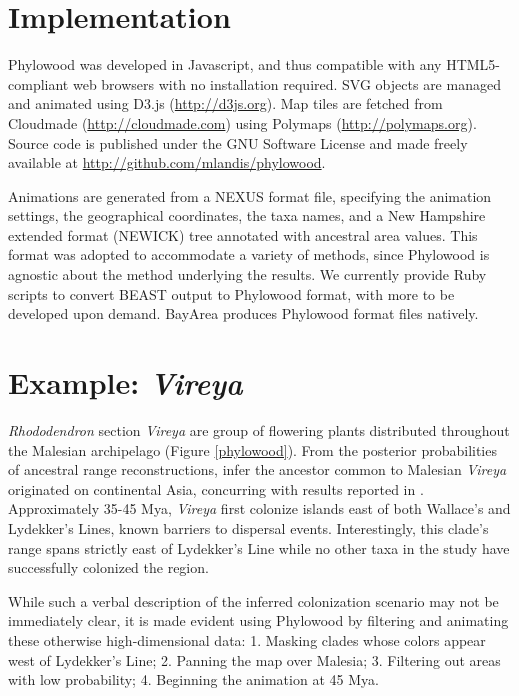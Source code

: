 \documentclass[11pt]{article}
\begin{document}
\section{Implementation}

Phylowood was developed in Javascript, and thus compatible with any HTML5-compliant web browsers with no installation required. SVG objects are managed and animated using D3.js (\url{http://d3js.org}). Map tiles are fetched from Cloudmade (\url{http://cloudmade.com}) using Polymaps (\url{http://polymaps.org}). Source code is published under the GNU Software License and made freely available at \url{http://github.com/mlandis/phylowood}.

Animations are generated from a NEXUS format file, specifying the animation settings, the geographical coordinates, the taxa names, and a New Hampshire extended format (NEWICK) tree annotated with ancestral area values. This format was adopted to accommodate a variety of methods, since Phylowood is agnostic about the method underlying the results. We currently provide Ruby scripts to convert BEAST output to Phylowood format, with more to be developed upon demand. BayArea produces Phylowood format files natively.

\section{Example: {\it Vireya}}

{\it Rhododendron} section {\it Vireya} are group of flowering plants distributed throughout the Malesian archipelago (Figure \ref{phylowood}). From the posterior probabilities of ancestral range reconstructions, \cite{landis12} infer the ancestor common to Malesian {\it Vireya} originated on continental Asia, concurring with results reported in \cite{webb12}. Approximately 35-45 Mya, {\it Vireya} first colonize islands east of both Wallace's and Lydekker's Lines, known barriers to dispersal events. Interestingly, this clade's range spans strictly east of Lydekker's Line while no other taxa in the study have successfully colonized the region.

While such a verbal description of the inferred colonization scenario may not be immediately clear, it is made evident using Phylowood by filtering and animating these otherwise high-dimensional data: 1. Masking clades whose colors appear west of Lydekker's Line; 2. Panning the map over Malesia; 3. Filtering out areas with low probability; 4. Beginning the animation at 45 Mya.
\end{document}
